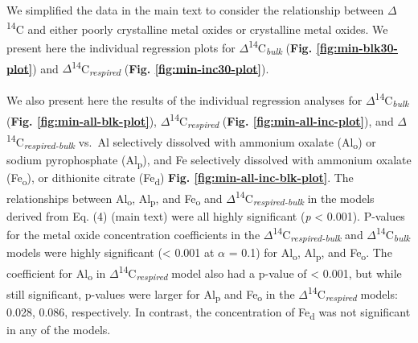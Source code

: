 \documentclass[english,man,floatsintext]{apa6}
\begin{document}
We simplified the data in the main text to consider the relationship between \(\Delta\)\textsuperscript{14}C and either poorly crystalline metal oxides or crystalline metal oxides. We present here the individual regression plots for \(\Delta\)\textsuperscript{14}C\textsubscript{\emph{bulk}} (\textbf{Fig. \ref{fig:min-blk30-plot}}) and \(\Delta\)\textsuperscript{14}C\textsubscript{\emph{respired}} (\textbf{Fig. \ref{fig:min-inc30-plot}}).

We also present here the results of the individual regression analyses for \(\Delta\)\textsuperscript{14}C\textsubscript{\emph{bulk}} (\textbf{Fig. \ref{fig:min-all-blk-plot}}), \(\Delta\)\textsuperscript{14}C\textsubscript{\emph{respired}} (\textbf{Fig. \ref{fig:min-all-inc-plot}}), and \(\Delta\)\textsuperscript{14}C\textsubscript{\emph{respired-bulk}} vs.~Al selectively dissolved with ammonium oxalate (Al\textsubscript{o}) or sodium pyrophosphate (Al\textsubscript{p}), and Fe selectively dissolved with ammonium oxalate (Fe\textsubscript{o}), or dithionite citrate (Fe\textsubscript{d}) \textbf{Fig. \ref{fig:min-all-inc-blk-plot}}. The relationships between Al\textsubscript{o}, Al\textsubscript{p}, and Fe\textsubscript{o} and \(\Delta\)\textsuperscript{14}C\textsubscript{\emph{respired-bulk}} in the models derived from Eq. (4) (main text) were all highly significant (\emph{p} \textless{} 0.001). P-values for the metal oxide concentration coefficients in the \(\Delta\)\textsuperscript{14}C\textsubscript{\emph{respired-bulk}} and \(\Delta\)\textsuperscript{14}C\textsubscript{\emph{bulk}} models were highly significant (\textless{} 0.001 at \(\alpha\) = 0.1) for Al\textsubscript{o}, Al\textsubscript{p}, and Fe\textsubscript{o}. The coefficient for Al\textsubscript{o} in \(\Delta\)\textsuperscript{14}C\textsubscript{\emph{respired}} model also had a p-value of \textless{} 0.001, but while still significant, p-values were larger for Al\textsubscript{p} and Fe\textsubscript{o} in the \(\Delta\)\textsuperscript{14}C\textsubscript{\emph{respired}} models: 0.028, 0.086, respectively.
In contrast, the concentration of Fe\textsubscript{d} was not significant in any of the models.
\end{document}
